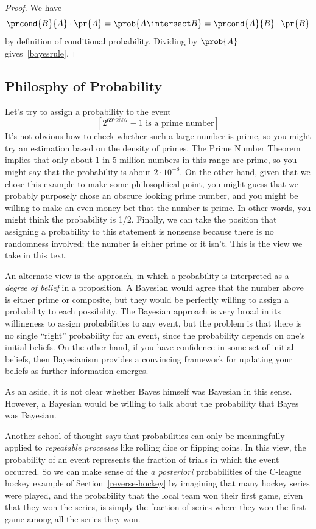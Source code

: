 \begin{proof}
We have
\[
\prcond{B}{A} \cdot \pr{A} = \prob{A \intersect B} = \prcond{A}{B} \cdot \pr{B}
\]
by definition of conditional probability.  Dividing by $\prob{A}$
gives~\eqref{bayesrule}.
\end{proof}

\subsection{Philosphy of Probability}

Let's try to assign a probability to the event
%
\[
[2^{6972607} - 1 \text{ is a prime number}]
\]
It's not obvious how to check whether such a large number is prime, so
you might try an estimation based on the density of primes.  The Prime
Number Theorem implies that only about $1$ in 5 million numbers in
this range are prime, so you might say that the probability is about
$2 \cdot 10^{-8}$.  On the other hand, given that we chose this
example to make some philosophical point, you might guess that we
probably purposely chose an obscure looking prime number, and you
might be willing to make an even money bet that the number is prime.
In other words, you might think the probability is 1/2.  Finally, we
can take the position that assigning a probability to this statement
is nonsense because there is no randomness involved; the number is
either prime or it isn't.  This is the view we take in this text.

An alternate view is the  approach, in which a
probability is interpreted as a \emph{degree of belief} in a
proposition.  A Bayesian would agree that the number above is either
prime or composite, but they would be perfectly willing to assign a
probability to each possibility.  The Bayesian approach is very broad
in its willingness to assign probabilities to any event, but the
problem is that there is no single ``right'' probability for an event,
since the probability depends on one's initial beliefs.  On the other
hand, if you have confidence in some set of initial beliefs, then
Bayesianism provides a convincing framework for updating your beliefs
as further information emerges.

As an aside, it is not clear whether Bayes himself was Bayesian in
this sense.  However, a Bayesian would be willing to talk about the
probability that Bayes was Bayesian.

Another school of thought says that probabilities can only be
meaningfully applied to \emph{repeatable processes} like rolling dice
or flipping coins.  In this  view, the probability
of an event represents the fraction of trials in which the event
occurred.  So we can make sense of the \emph{a posteriori}
probabilities of the C-league hockey example of
Section~\ref{reverse-hockey} by imagining that many hockey series were
played, and the probability that the local team won their first game,
given that they won the series, is simply the fraction of series where
they won the first game among all the series they won.

